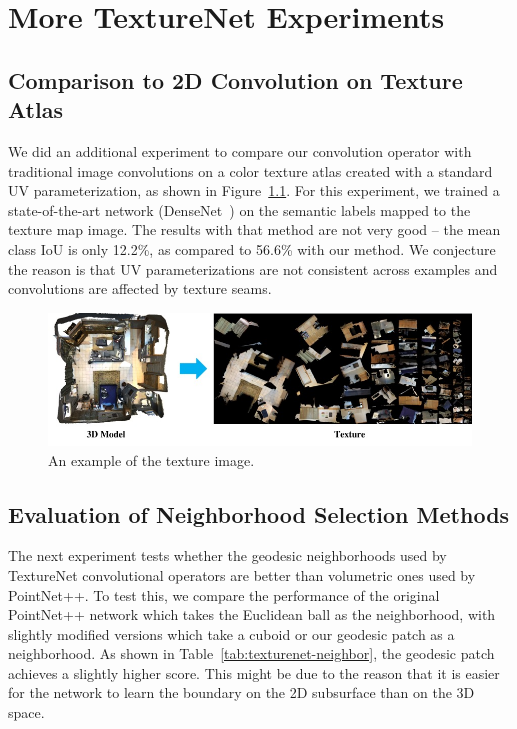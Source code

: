 \chapter{More TextureNet Experiments}
\section{Comparison to 2D Convolution on Texture Atlas}

We did an additional experiment to compare our convolution operator with traditional image convolutions on a color texture atlas created with a standard UV parameterization, as shown in Figure~\ref{fig:texturenet-textureimage}. For this experiment, we trained a state-of-the-art network (DenseNet~\cite{huang2017densely}) on the semantic labels mapped to the texture map image.  The results with that method are not very good -- the mean class IoU is only 12.2\%, as compared to 56.6\% with our method.  We conjecture the reason is that UV parameterizations are not consistent across examples and convolutions are affected by texture seams. 

\begin{figure}[h]
    \centering
    \includegraphics[width=\linewidth]{texturenet/diagram/texture.jpg}
    \caption{An example of the texture image.}
    \label{fig:texturenet-textureimage}
\end{figure}


\section{Evaluation of Neighborhood Selection Methods}

The next experiment tests whether the geodesic neighborhoods used by TextureNet convolutional operators are better than volumetric ones used by PointNet++.   To test this, we compare the performance of the original PointNet++ network which takes the Euclidean ball as the neighborhood, with slightly modified versions which take a cuboid or our geodesic patch as a neighborhood. As shown in Table~\ref{tab:texturenet-neighbor}, the geodesic patch achieves a slightly higher score. This might be due to the reason that it is easier for the network to learn the boundary on the 2D subsurface than on the 3D space.


